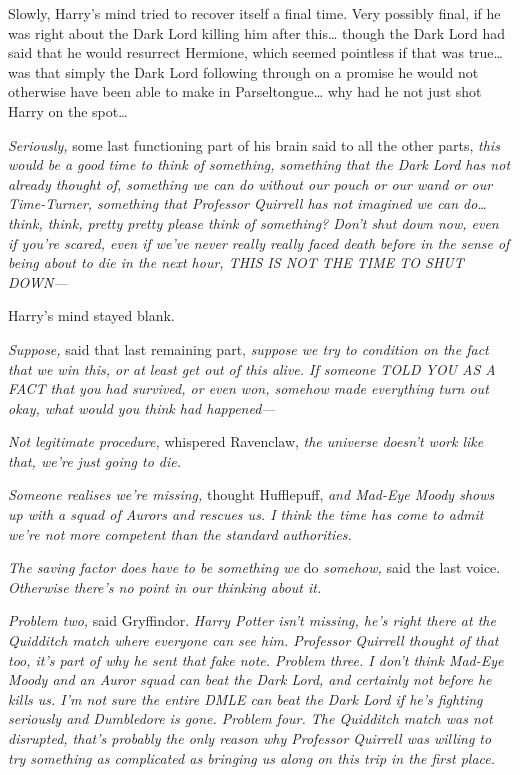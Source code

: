 Slowly, Harry's mind tried to recover itself a final time. Very possibly final,
if he was right about the Dark Lord killing him after this{\ldots} though the
Dark Lord had said that he would resurrect Hermione, which seemed pointless if
that was true{\ldots} was that simply the Dark Lord following through on a
promise he would not otherwise have been able to make in Parseltongue{\ldots}
why had he not just shot Harry on the spot{\ldots}

\emph{Seriously,} some last functioning part of his brain said to all the other
parts, \emph{this would be a good time to think of something, something that
the Dark Lord has not already thought of, something we can do without our pouch
or our wand or our Time-Turner, something that Professor Quirrell has not
imagined we can do{\ldots} think, think, pretty pretty please think of
something? Don't shut down now, even if you're scared, even if we've never
really really faced death before in the sense of being about to die in the next
hour, THIS IS NOT THE TIME TO SHUT DOWN---}

Harry's mind stayed blank.

\emph{Suppose,} said that last remaining part, \emph{suppose we try to
condition on the fact that we win this, or at least get out of this alive. If
someone TOLD YOU AS A FACT that you had survived, or even won, somehow made
everything turn out okay, what would you think had happened---}

\emph{Not legitimate procedure,} whispered Ravenclaw, \emph{the universe
doesn't work like that, we're just going to die.}

\emph{Someone realises we're missing,} thought Hufflepuff, \emph{and Mad-Eye
Moody shows up with a squad of Aurors and rescues us. I think the time has come
to admit we're not more competent than the standard authorities.}

\emph{The saving factor does have to be something we} do \emph{somehow,} said
the last voice. \emph{Otherwise there's no point in our thinking about it.}

\emph{Problem two,} said Gryffindor. \emph{Harry Potter isn't missing, he's
right there at the Quidditch match where everyone can see him. Professor
Quirrell thought of that too, it's part of why he sent that fake note. Problem
three. I don't think Mad-Eye Moody and an Auror squad can beat the Dark Lord,
and certainly not before he kills us. I'm not sure the entire DMLE can beat the
Dark Lord if he's fighting seriously and Dumbledore is gone. Problem four. The
Quidditch match was not disrupted, that's probably the only reason why
Professor Quirrell was willing to try something as complicated as bringing us
along on this trip in the first place.}

